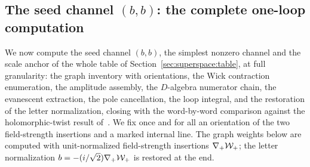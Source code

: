 
\subsection{The seed channel $(b,b)$: the complete one-loop computation}%
\label{sec:superspace:seed}

We now compute the seed channel $(b,b)$, the simplest nonzero channel and the
scale anchor of the whole table of Section~\ref{sec:superspace:table}, at full
granularity: the graph inventory with orientations, the Wick contraction
enumeration, the amplitude assembly, the $D$-algebra numerator chain, the
evanescent extraction, the pole cancellation, the loop integral, and the
restoration of the letter normalization, closing with the word-by-word
comparison against the holomorphic-twist result of~\cite{BK}. We fix once and
for all an orientation of the two field-strength insertions and a marked
internal line. The graph weights below are computed with unit-normalized
field-strength insertions $\nabla_+\mathcal{W}_+$; the letter normalization
$b=-(i/\sqrt2)\nabla_+\mathcal{W}_+$ is restored at the end.

